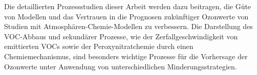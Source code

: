 Die detaillierten Prozessstudien dieser Arbeit werden dazu beitragen, die Güte von Modellen und das Vertrauen in die Prognosen zukünftiger Ozonwerte von Studien mit Atmosphären-Chemie-Modellen zu verbessern.
Die Darstellung des VOC-Abbaus und sekundärer Prozesse, wie der Zerfallgeschwindigkeit von emittierten VOCs sowie der Peroxynitratchemie durch einen Chemiemechanismus, sind besonders wichtige Prozesse für die Vorhersage der Ozonwerte unter Anwendung von unterschiedlichen Minderungsstrategien.
